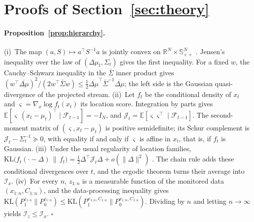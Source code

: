 \section{Proofs of Section~\ref{sec:theory}}\label{app:proofs}

\paragraph{Proposition~\ref{prop:hierarchy}.}
(i)~The map $(a,S)\mapsto a^{\top}S^{-1}a$ is jointly convex on $\mathbb{R}^N\times\mathbb{S}^N_{++}$ \citep[\S3.1.7]{boyd_vandenberghe_2004}. Jensen's inequality over the law of $(\Delta\mu_t,\Sigma_t)$ gives the first inequality. For a fixed $w$, the Cauchy--Schwarz inequality in the $\bar\Sigma$ inner product gives $(w^{\top}\overline{\Delta\mu})^2/(2w^{\top}\bar\Sigma w)\le\tfrac12\overline{\Delta\mu}^{\top}\bar\Sigma^{-1}\overline{\Delta\mu}$; the left side is the Gaussian quasi-divergence of the projected stream.
(ii)~Let $f_t$ be the conditional density of $x_t$ and $\varsigma=\nabla_x\log f_t(x_t)$ its location score. Integration by parts gives $\mathbb{E}[\varsigma\,(x_t-\mu_t)^{\top}\mid\mathcal{F}_{t-1}]=-I_N$, and $\mathcal{J}_t=\mathbb{E}[\varsigma\varsigma^{\top}\mid\mathcal{F}_{t-1}]$. The second-moment matrix of $(\varsigma,x_t-\mu_t)$ is positive semidefinite; its Schur complement is $\mathcal{J}_t-\Sigma_t^{-1}\succeq0$, with equality if and only if $\varsigma$ is affine in $x_t$, that is, if $f_t$ is Gaussian.
(iii)~Under the usual regularity of location families, $\mathrm{KL}\big(f_t(\cdot-\Delta)\,\|\,f_t\big)=\tfrac12\Delta^{\top}\mathcal{J}_t\Delta+o(\|\Delta\|^2)$ \citep{kullback_1959}. The chain rule adds these conditional divergences over $t$, and the ergodic theorem turns their average into $\mathcal{I}_x$.
(iv)~For every $n$, $z_{1:n}$ is a measurable function of the monitored data $(x_{1:n},C_{1:n})$, and the data-processing inequality \citep{cover_thomas_2006} gives $\mathrm{KL}(P_1^{z_{1:n}}\|P_0^{z_{1:n}})\le\mathrm{KL}(P_1^{x_{1:n},C_{1:n}}\|P_0^{x_{1:n},C_{1:n}})$. Dividing by $n$ and letting $n\to\infty$ yields $\mathcal{I}_z\le\mathcal{I}_x$. \hfill$\square$

